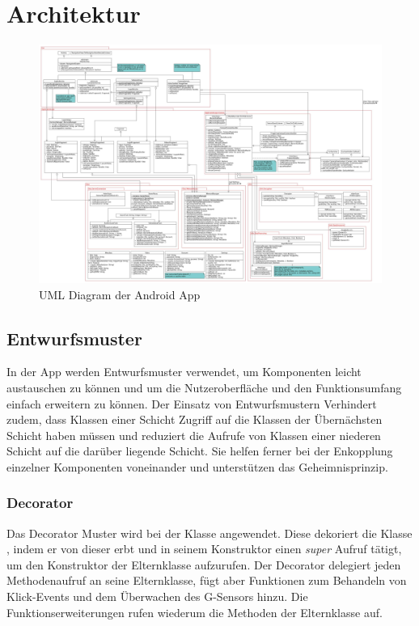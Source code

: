 \section{Architektur}

\begin{figure}[ht]
	\centering
\includegraphics[width=1\textwidth]{./resources/Diagramme/App/UMLAndroidApp.jpg}
\caption{UML Diagram der Android App}
	\label{fig:modules_overview}
\end{figure}

\subsection{Entwurfsmuster}
In der App werden Entwurfsmuster verwendet, um Komponenten leicht austauschen zu können und um die Nutzeroberfläche und den Funktionsumfang einfach erweitern zu können. Der Einsatz von Entwurfsmustern Verhindert  zudem, dass Klassen einer Schicht Zugriff auf die Klassen der Übernächsten Schicht haben müssen und reduziert die Aufrufe von Klassen einer niederen Schicht auf die darüber liegende Schicht. Sie helfen ferner bei der Enkopplung einzelner Komponenten voneinander und unterstützen das Geheimnisprinzip.

\subsubsection{Decorator}
Das Decorator Muster wird bei der Klasse  angewendet. Diese dekoriert die Klasse , indem er von dieser erbt und in seinem Konstruktor einen \textit{super} Aufruf tätigt, um den Konstruktor der Elternklasse aufzurufen. Der Decorator delegiert jeden Methodenaufruf an seine Elternklasse, fügt aber Funktionen zum Behandeln von Klick-Events und dem Überwachen des G-Sensors hinzu. Die Funktionserweiterungen rufen wiederum die Methoden der Elternklasse auf.


